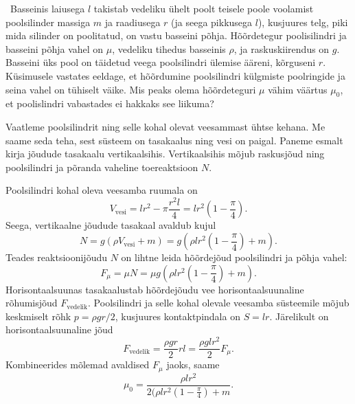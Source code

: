 
\
	Basseinis laiusega $l$ takistab vedeliku ühelt poolt teisele poole voolamist poolsilinder massiga $m$ ja raadiusega $r$ (ja seega pikkusega $l$), kusjuures telg, piki mida silinder on poolitatud, on vastu basseini põhja. Hõõrdetegur poolisilindri ja basseini põhja vahel on $\mu$, vedeliku tihedus basseinis $\rho$, ja raskuskiirendus on $g$. Basseini üks pool on täidetud veega poolsilindri ülemise ääreni, kõrguseni $r$. Küsimusele vastates eeldage, et hõõrdumine poolsilindri külgmiste poolringide ja seina vahel on tühiselt väike. Mis peaks olema hõõrdeteguri $\mu$ vähim väärtus $\mu_0$, et poolislindri vabastades ei hakkaks see liikuma?
	
	
	
\hint

\solu
Vaatleme poolsilindrit ning selle kohal olevat veesammast ühtse kehana. Me saame seda teha, sest süsteem on tasakaalus ning vesi on paigal.
Paneme esmalt kirja jõudude tasakaalu vertikaalsihis.
Vertikaalsihis mõjub raskusjõud ning poolsilindri ja põranda vaheline toereaktsioon $N$.

Poolsilindri kohal oleva veesamba ruumala on
\begin{equation*}
	V_{\mathrm{vesi}}=l r^2-\pi \frac{r^2 l}{4}=l r^2\left(1-\frac{\pi}{4}\right).
\end{equation*}
Seega, vertikaalne jõudude tasakaal avaldub kujul
\begin{equation*}
	N=g(\rho V_{\mathrm{vesi}} + m) = g\left(\rho l r^2\left(1-\frac{\pi}{4}\right) + m\right).
\end{equation*}
Teades reaktsioonijõudu $N$ on lihtne leida hõõrdejõud poolsilindri ja põhja vahel:
\begin{equation*}
	F_{\mu}=\mu N= \mu g \left(\rho l r^2\left(1-\frac{\pi}{4}\right) + m\right).
\end{equation*} 
Horisontaalsuunas tasakaalustab hõõrdejõudu vee horisontaalsuunaline rõhumisjõud $F_{\mathrm{vedelik}}$. Poolsilindri ja selle kohal olevale veesamba süsteemile mõjub keskmiselt rõhk $p = \rho gr/2$, kusjuures kontaktpindala on $S = lr$. Järelikult on horisontaalsuunaline jõud
\begin{equation*}
	F_{\mathrm{vedelik}}=\frac{\rho g r}{2}r l=\frac{\rho g l r^2}{2} F_{\mu}.
\end{equation*}
Kombineerides mõlemad avaldised $F_\mu$ jaoks, saame
\begin{equation*}
	\mu_0=\frac{\rho l r^2}{2(\rho l r^2(1-\frac{\pi}{4})+m}.
\end{equation*}
\probend